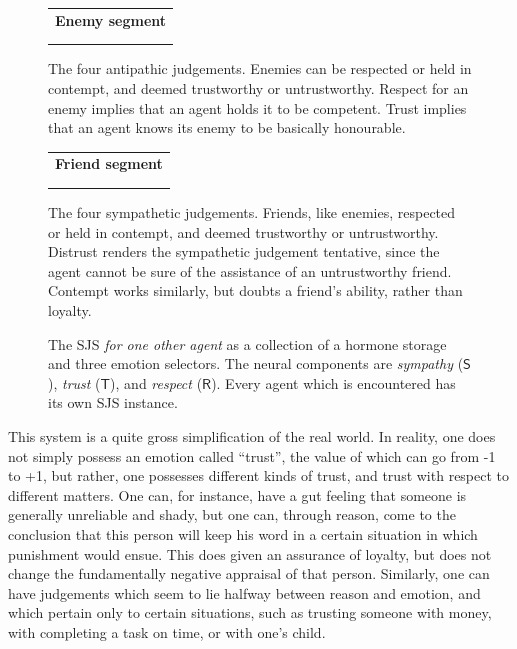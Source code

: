 \begin{figure}[t]
	\centering
	\begin{tabular}{c}
	\textbf{\Large Enemy segment}\\
	\\
	\\
	\end{tabular}
	
	\caption{The four antipathic judgements. Enemies can be respected or held in contempt, and deemed trustworthy or untrustworthy. Respect for an enemy implies that an agent holds it to be competent. Trust implies that an agent knows its enemy to be basically honourable.}
	\label{fig:SJS_enemy}
\end{figure}

\begin{figure}[t]
	\centering
	\begin{tabular}{c}
	\textbf{\Large Friend segment}\\
	\\
	\\
	\end{tabular}
	
	\caption{The four sympathetic judgements. Friends, like enemies, respected or held in contempt, and deemed trustworthy or untrustworthy. Distrust renders the sympathetic judgement tentative, since the agent cannot be sure of the assistance of an untrustworthy friend. Contempt works similarly, but doubts a friend's ability, rather than loyalty.}
	\label{fig:SJS_friend}
\end{figure}

\begin{figure}[t]
	\centering
	
	\caption{The SJS {\em for one other agent} as a collection of a hormone storage and three emotion selectors. The neural components are {\em sympathy} ($\mathsf{S}$), {\em trust} ($\mathsf{T}$), and {\em respect} ($\mathsf{R}$). Every agent which is encountered has its own SJS instance.}
	\label{fig:SJS_system}
\end{figure}

This system is a quite gross simplification of the real world. In reality, one does not simply possess an emotion called ``trust'', the value of which can go from -1 to +1, but rather, one possesses different kinds of trust, and trust with respect to different matters. One can, for instance, have a gut feeling that someone is generally unreliable and shady, but one can, through reason, come to the conclusion that this person will keep his word in a certain situation in which punishment would ensue. This does given an assurance of loyalty, but does not change the fundamentally negative appraisal of that person. Similarly, one can have judgements which seem to lie halfway between reason and emotion, and which pertain only to certain situations, such as trusting someone with money, with completing a task on time, or with one's child.

